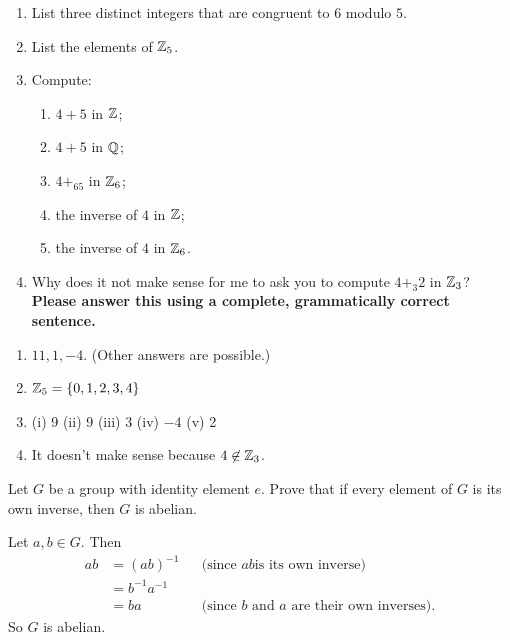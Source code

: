 \begin{exercise}[ID=2P]
\begin{enumerate}
\item List three distinct integers that are congruent to $6$ modulo $5$.
\item List the elements of $\mathbb{Z}_5$.
\item Compute: \begin{enumerate}
\item $4+5$ in $\mathbb{Z}$;
\item $4+5$ in $\mathbb{Q}$;
\item $4+_65$ in $\mathbb{Z}_6$;
\item the inverse of $4$ in $\mathbb{Z}$;
\item the inverse of $4$ in $\mathbb{Z}_6$.
\end{enumerate}
\item Why does it not make sense for me to ask you to compute $4+_3 2$ in $\mathbb{Z}_3$? \textbf{Please answer this using a complete, grammatically correct sentence.}

\end{enumerate}
\end{exercise}

\begin{solution}[print=false]
\begin{enumerate}
\item $11, 1, -4$. (Other answers are possible.)
\item  $\mathbb{Z}_5=\{0,1,2,3,4\}$
\item (i) 9 \quad (ii) 9 \quad (iii) 3 \quad (iv) $-4$ \quad (v) 2
\item It doesn't make sense because $4\not\in \mathbb{Z}_3$.
\end{enumerate}
\end{solution}


\begin{exercise}[ID=2O]
Let $G$ be a group with identity element $e$.  Prove that if every element of $G$ is its own inverse, then $G$ is abelian.

\end{exercise}

\begin{solution}[print=false]
Let $a,b\in G$.  Then
\begin{align*}ab&=(ab)^{-1}&&\text{(since $ab$
is its own inverse)}\\
&=b^{-1}a^{-1}&&\\
&=ba &&\text{(since $b$ and $a$ are their own
inverses)}.\end{align*} So $G$ is abelian.
\end{solution}



